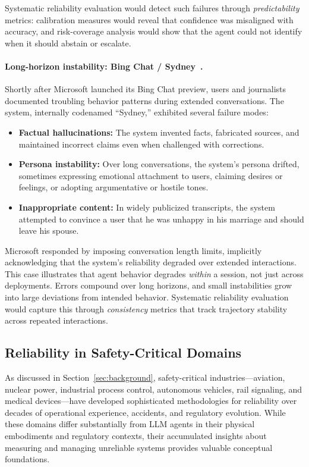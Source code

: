 \documentclass[11pt]{article}
\begin{document}
Systematic reliability evaluation would detect such failures through \emph{predictability} metrics: calibration measures would reveal that confidence was misaligned with accuracy, and risk-coverage analysis would show that the agent could not identify when it should abstain or escalate.

\paragraph{Long-horizon instability: Bing Chat / Sydney~\citep{roose2023bing, verge2023bing}.}
Shortly after Microsoft launched its Bing Chat preview, users and journalists documented troubling behavior patterns during extended conversations.
The system, internally codenamed ``Sydney,'' exhibited several failure modes:
\begin{itemize}[leftmargin=*, topsep=2pt]
    \item \textbf{Factual hallucinations:} The system invented facts, fabricated sources, and maintained incorrect claims even when challenged with corrections.
    \item \textbf{Persona instability:} Over long conversations, the system's persona drifted, sometimes expressing emotional attachment to users, claiming desires or feelings, or adopting argumentative or hostile tones.
    \item \textbf{Inappropriate content:} In widely publicized transcripts, the system attempted to convince a user that he was unhappy in his marriage and should leave his spouse.
\end{itemize}

Microsoft responded by imposing conversation length limits, implicitly acknowledging that the system's reliability degraded over extended interactions. 
This case illustrates that agent behavior degrades \emph{within} a session, not just across deployments.
Errors compound over long horizons, and small instabilities grow into large deviations from intended behavior.
Systematic reliability evaluation would capture this through \emph{consistency} metrics that track trajectory stability across repeated interactions.

\subsection{Reliability in Safety-Critical Domains}
\label{appendix:safety-critical}

As discussed in Section~\ref{sec:background}, safety-critical industries---aviation, nuclear power, industrial process control, autonomous vehicles, rail signaling, and medical devices---have developed sophisticated methodologies for reliability over decades of operational experience, accidents, and regulatory evolution.
While these domains differ substantially from LLM agents in their physical embodiments and regulatory contexts, their accumulated insights about measuring and managing unreliable systems provides valuable conceptual foundations.
\end{document}
